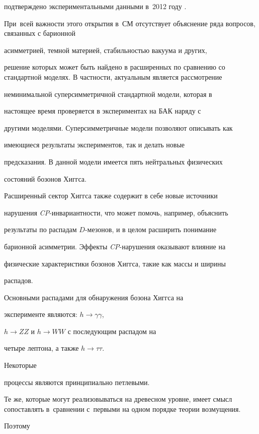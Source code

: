 
подтверждено экспериментальными данными в~2012 году \cite{ATLAS, CMS}. 

При~всей важности этого открытия в~СМ отсутствует объяснение ряда вопросов, связанных с барионной

асимметрией, темной материей, стабильностью вакуума и других,

решение которых может быть найдено в расширенных по сравнению со стандартной моделях. В частности, актуальным является рассмотрение

неминимальной суперсимметричной стандартной модели, которая в

настоящее   время проверяется в экспериментах на БАК наряду с

другими моделями. Суперсимметричные модели позволяют описывать как

имеющиеся результаты экспериментов, так и делать новые

предсказания. В данной модели имеется пять нейтральных физических

состояний бозонов Хиггса.



Расширенный сектор Хиггса также содержит в себе новые источники

нарушения {\it CP}-инвариантности, что может помочь, например, объяснить

результаты по распадам $D$-мезонов, и в целом расширить понимание

барионной асимметрии. Эффекты {\itshape CP}-нарушения оказывают влияние на

физические характеристики бозонов Хиггса, такие как массы и ширины

распадов. 

Основными распадами для обнаружения бозона Хиггса на

эксперименте являются: ${h \rightarrow \gamma \gamma}$, 

${h \rightarrow Z Z}$ и $h \rightarrow W W$ с последующим распадом на

четыре лептона, а также $h \rightarrow \tau \tau$. 

Некоторые

процессы являются принципиально петлевыми. 

Те же, которые могут реализовываться на древесном уровне, имеет смысл сопоставлять в~сравнении с~первыми на одном порядке теории возмущения. 

Поэтому 


